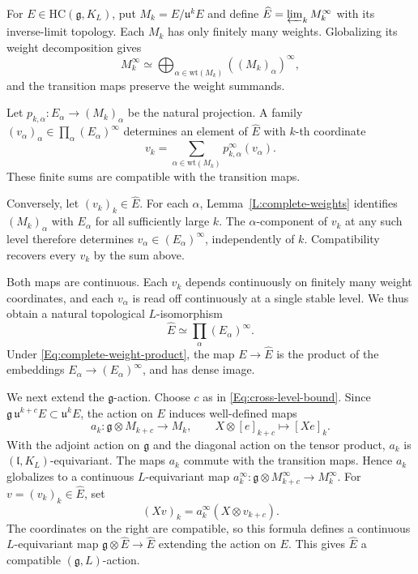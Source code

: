 \documentclass[a4paper,12pt]{amsart}
\numberwithin{equation}{section}
\theoremstyle{plain}
\theoremstyle{definition}
\theoremstyle{remark}
\newcommand{\HC}{\mathrm{HC}}
\begin{document}
For $E\in\HC(\mathfrak g,K_L)$, put $M_k=E/\mathfrak u^kE$ and define $\widehat E=\varprojlim_k M_k^\infty$ with its inverse-limit topology.
Each $M_k$ has only finitely many weights.
Globalizing its weight decomposition gives
\[
 M_k^\infty
 \simeq\bigoplus_{\alpha\in\mathrm{wt}(M_k)}((M_k)_\alpha)^\infty,
\]
and the transition maps preserve the weight summands.

Let $p_{k,\alpha}:E_\alpha\to(M_k)_\alpha$ be the natural projection.
A family $(v_\alpha)_\alpha\in\prod_\alpha(E_\alpha)^\infty$ determines an element of $\widehat E$ with $k$-th coordinate
\[
 v_k=\sum_{\alpha\in\mathrm{wt}(M_k)}p_{k,\alpha}^\infty(v_\alpha).
\]
These finite sums are compatible with the transition maps.

Conversely, let $(v_k)_k\in\widehat E$.
For each $\alpha$, Lemma~\ref{L:complete-weights} identifies $(M_k)_\alpha$ with $E_\alpha$ for all sufficiently large $k$.
The $\alpha$-component of $v_k$ at any such level therefore determines $v_\alpha\in(E_\alpha)^\infty$, independently of $k$.
Compatibility recovers every $v_k$ by the sum above.

Both maps are continuous.
Each $v_k$ depends continuously on finitely many weight coordinates, and each $v_\alpha$ is read off continuously at a single stable level.
We thus obtain a natural topological $L$-isomorphism
\begin{equation}\label{glob-iso}
 \widehat E\simeq\prod_\alpha(E_\alpha)^\infty.
\end{equation}
Under \eqref{Eq:complete-weight-product}, the map $E\to\widehat E$ is the product of the embeddings $E_\alpha\to(E_\alpha)^\infty$, and has dense image.

We next extend the $\mathfrak g$-action.
Choose $c$ as in \eqref{Eq:cross-level-bound}.
Since $\mathfrak g\,\mathfrak u^{k+c}E\subset\mathfrak u^kE$, the action on $E$ induces well-defined maps
\[
 a_k:\mathfrak g\otimes M_{k+c}\longrightarrow M_k,\qquad
 X\otimes[e]_{k+c}\longmapsto[Xe]_k.
\]
With the adjoint action on $\mathfrak g$ and the diagonal action on the tensor product, $a_k$ is $(\mathfrak l,K_L)$-equivariant.
The maps $a_k$ commute with the transition maps.
Hence $a_k$ globalizes to a continuous $L$-equivariant map $a_k^\infty:\mathfrak g\otimes M_{k+c}^\infty\to M_k^\infty$.
For $v=(v_k)_k\in\widehat E$, set
\[
 (Xv)_k=a_k^\infty(X\otimes v_{k+c}).
\]
The coordinates on the right are compatible, so this formula defines a continuous $L$-equivariant map $\mathfrak g\otimes\widehat E\to\widehat E$ extending the action on $E$.
This gives $\widehat E$ a compatible $(\mathfrak g,L)$-action.
\end{document}
